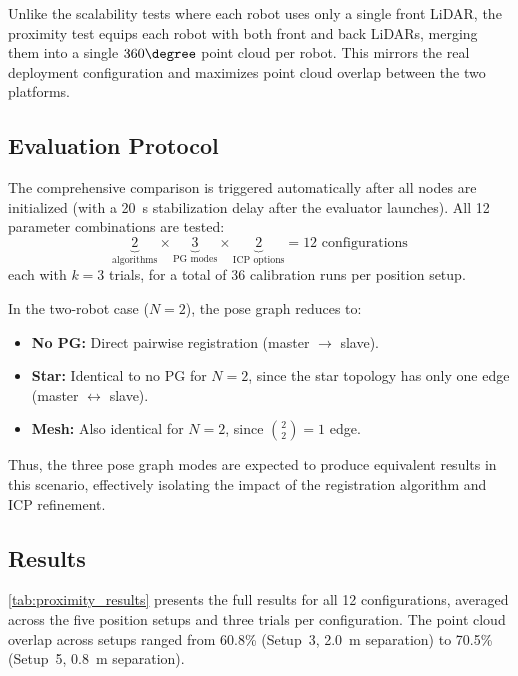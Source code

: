 Unlike the scalability tests where each robot uses only a single
front LiDAR, the proximity test equips each robot with both front
and back LiDARs, merging them into a single $360\degree$ point
cloud per robot.
This mirrors the real deployment configuration and maximizes
point cloud overlap between the two platforms.

\subsection{Evaluation Protocol}

The comprehensive comparison is triggered automatically after
all nodes are initialized (with a \SI{20}{\second} stabilization
delay after the evaluator launches).
All 12 parameter combinations are tested:
\begin{equation*}
    \underbrace{2}_\text{algorithms}
    \times
    \underbrace{3}_\text{PG modes}
    \times
    \underbrace{2}_\text{ICP options}
    = 12 \text{ configurations}
\end{equation*}
each with $k = 3$ trials, for a total of 36 calibration runs per
position setup.

In the two-robot case ($N = 2$), the pose graph reduces to:
\begin{itemize}
    \item \textbf{No PG:} Direct pairwise registration
          (master $\to$ slave).
    \item \textbf{Star:} Identical to no PG for $N = 2$, since
          the star topology has only one edge
          (master $\leftrightarrow$ slave).
    \item \textbf{Mesh:} Also identical for $N = 2$, since
          $\binom{2}{2} = 1$ edge.
\end{itemize}
Thus, the three pose graph modes are expected to produce equivalent
results in this scenario, effectively isolating the impact of the
registration algorithm and ICP refinement.

\subsection{Results}

\autoref{tab:proximity_results} presents the full results for all
12 configurations, averaged across the five position setups and
three trials per configuration.
The point cloud overlap across setups ranged from 60.8\% (Setup~3,
\SI{2.0}{\metre} separation) to 70.5\% (Setup~5, \SI{0.8}{\metre}
separation).

